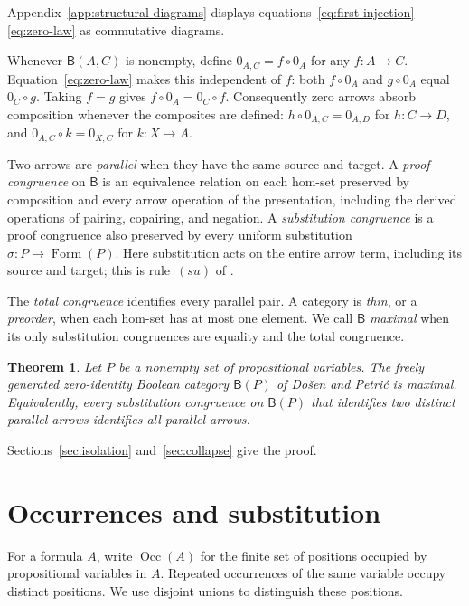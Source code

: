 \documentclass[11pt]{article}
\newtheorem{theorem}{Theorem}[section]
\newcommand{\B}{\mathsf B}
\newcommand{\Occ}{\operatorname{Occ}}
\newcommand{\FormulaSet}{\operatorname{Form}}
\begin{document}
Appendix~\ref{app:structural-diagrams} displays
equations~\eqref{eq:first-injection}--\eqref{eq:zero-law}
as commutative diagrams.

Whenever $\B(A,C)$ is nonempty, define $0_{A,C}=f\circ0_A$ for any
$f:A\to C$. Equation~\eqref{eq:zero-law} makes this independent of
$f$: both $f\circ0_A$ and $g\circ0_A$ equal $0_C\circ g$.
Taking $f=g$ gives $f\circ0_A=0_C\circ f$. Consequently zero arrows
absorb composition whenever the composites are defined:
$h\circ0_{A,C}=0_{A,D}$ for $h:C\to D$, and
$0_{A,C}\circ k=0_{X,C}$ for $k:X\to A$.

Two arrows are \emph{parallel} when they have the same source and
target. A \emph{proof congruence} on $\B$ is an equivalence relation
on each hom-set preserved by composition and every arrow operation
of the presentation, including the derived operations of pairing,
copairing, and negation.
A \emph{substitution congruence} is a proof congruence also preserved
by every uniform substitution $\sigma:P\to\FormulaSet(P)$.
Here substitution acts on the entire arrow term, including its source
and target; this is rule~$(su)$ of \cite[\S2.7, p.~51]{DP}.

The \emph{total congruence} identifies every parallel pair. A category
is \emph{thin}, or a \emph{preorder}, when each hom-set has at most one
element. We call $\B$ \emph{maximal} when its only substitution
congruences are equality and the total congruence.

\begin{theorem}\label{thm:main}
Let $P$ be a nonempty set of propositional variables. The freely
generated zero-identity Boolean category $\B(P)$ of Do\v{s}en and
Petri\'c is maximal. Equivalently, every substitution congruence on
$\B(P)$ that identifies two distinct parallel arrows identifies all
parallel arrows.
\end{theorem}

Sections~\ref{sec:isolation} and~\ref{sec:collapse} give the proof.

\section{Occurrences and substitution}\label{sec:occurrences}

For a formula $A$, write $\Occ(A)$ for the finite set of positions
occupied by propositional variables in $A$. Repeated occurrences of the
same variable occupy distinct positions. We use disjoint unions to
distinguish these positions.
\end{document}
